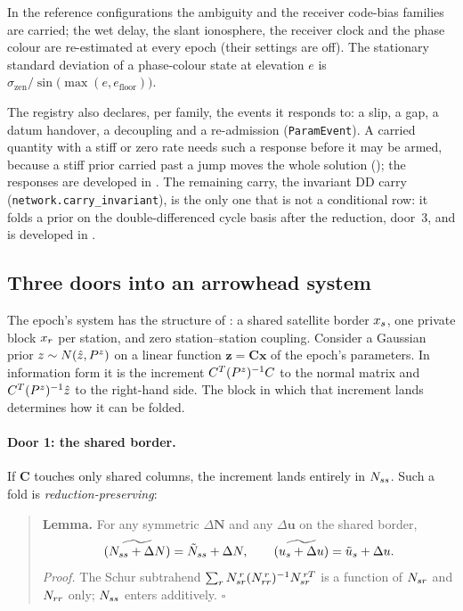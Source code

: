\documentclass[main.tex]{subfiles}
\begin{document}
In the reference configurations the ambiguity and the receiver code-bias
families are carried; the wet delay, the slant ionosphere, the receiver
clock and the phase colour are re-estimated at every epoch (their
settings are off).  The stationary standard deviation of a phase-colour
state at elevation $e$ is $\sigma_{\mathrm{zen}}/\sin\big(\max(e,
e_{\mathrm{floor}})\big)$.

The registry also declares, per family, the events it responds to: a
slip, a gap, a datum handover, a decoupling and a re-admission
(\texttt{ParamEvent}).  A carried quantity with a stiff or zero rate
needs such a response before it may be armed, because a stiff prior
carried past a jump moves the whole solution
(); the responses are developed in
.
The remaining carry, the invariant DD carry
(\texttt{network.carry\_invariant}), is the only one that is not a
conditional row: it folds a prior on the double-differenced cycle basis
after the reduction, door~3, and is developed in
.

\subsection{Three doors into an arrowhead system}
\label{sec:net-carry-doors}

The epoch's system has the structure of
: a shared satellite
border $x_s$, one private block $x_{r}$ per station, and
zero station--station coupling.  Consider a Gaussian prior
$z\sim N(\hat{z}, P^{z})$ on a linear function
$\bm{z} = \bm{C}\bm{x}$ of the epoch's parameters.  In information form
it is the increment $C^{T}(P^{z})^{-1}C$ to the normal matrix
and $C^{T}(P^{z})^{-1}\hat{z}$ to the right-hand side.  The block in
which that increment lands determines how it can be folded.

\paragraph{Door 1: the shared border.}
If $\bm{C}$ touches only shared columns, the increment lands entirely in
$N_{ss}$.  Such a fold is \emph{reduction-preserving}:

\begin{samepage}
\begin{quote}
\textbf{Lemma.} For any symmetric $\Delta\bm{N}$ and any $\Delta\bm{u}$
on the shared border,
\[
  \widetilde{\left(N_{ss} + \Delta N\right)} = \tilde{N}_{ss} + \Delta N,
  \qquad
  \widetilde{\left(u_s + \Delta u\right)} = \tilde{u}_s + \Delta u.
\]
\emph{Proof.} The Schur subtrahend
$\sum_r N_{sr}^{\,r}(N_{rr}^{\,r})^{-1}N_{sr}^{\,rT}$ is a function
of $N_{sr}$ and $N_{rr}$ only; $N_{ss}$ enters
 additively.
\hfill$\square$
\end{quote}
\end{samepage}
\end{document}
